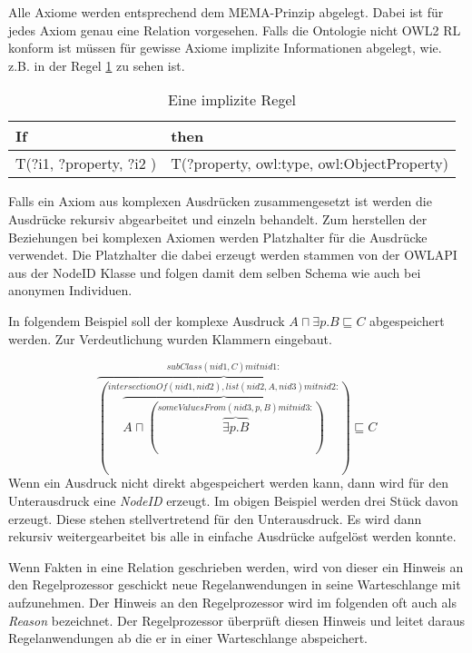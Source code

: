 Alle Axiome werden entsprechend dem MEMA-Prinzip abgelegt. Dabei ist für jedes Axiom genau eine Relation vorgesehen. Falls die Ontologie nicht OWL2 RL konform ist müssen für gewisse Axiome implizite Informationen abgelegt, wie. z.B. in der Regel \ref{rule-impl} zu sehen ist.

\begin{table}[htp]
	\caption{Eine implizite Regel}
	\label{rule-impl}
\begin{center}
	\begin{tabular}{l|l}
    If & then \\ \hline
	T(?i1, ?property, ?i2 ) & T(?property, owl:type, owl:ObjectProperty) \\
   \end{tabular}
\end{center}
\end{table}


Falls ein Axiom aus komplexen Ausdrücken zusammengesetzt ist werden die Ausdrücke rekursiv abgearbeitet und einzeln behandelt. Zum herstellen der Beziehungen bei komplexen Axiomen werden Platzhalter für die Ausdrücke verwendet. Die Platzhalter die dabei erzeugt werden stammen von der OWLAPI aus der NodeID Klasse und folgen damit dem selben Schema wie auch bei anonymen Individuen.

In folgendem Beispiel soll der komplexe Ausdruck $A \sqcap \exists p.B \sqsubseteq C$ abgespeichert werden. Zur Verdeutlichung wurden Klammern eingebaut.

\begin{equation}
\overbrace{
	(\overbrace{A \sqcap (
		\overbrace{\exists{}p.B}
		^{someValuesFrom(nid3, p, B) mit nid3:})}
	^{intersectionOf(nid1, nid2), list(nid2, A, nid3) mit nid2:})}
^{subClass(nid1, C) mit nid1:} \sqsubseteq C
\end{equation}
Wenn ein Ausdruck nicht direkt abgespeichert werden kann, dann wird für den Unterausdruck eine \emph{NodeID} erzeugt. Im obigen Beispiel werden drei Stück davon erzeugt. Diese stehen stellvertretend für den Unterausdruck. Es wird dann rekursiv weitergearbeitet bis alle in einfache Ausdrücke aufgelöst werden konnte.

Wenn Fakten in eine Relation geschrieben werden, wird von dieser ein Hinweis an den Regelprozessor geschickt neue Regelanwendungen in seine Warteschlange mit aufzunehmen. Der Hinweis an den Regelprozessor wird im folgenden oft auch als \emph{Reason} bezeichnet.
Der Regelprozessor überprüft diesen Hinweis und leitet daraus Regelanwendungen ab die er in einer Warteschlange abspeichert.

